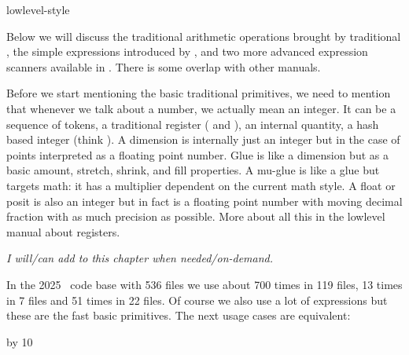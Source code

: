 
\environment lowlevel-style

\startdocument
  [title=expressions,
   color=darkorange]

\startsectionlevel[title=Introduction]

Below we will discuss the traditional arithmetic operations brought by
traditional \TEX, the simple expressions introduced by \ETEX, and two more
advanced expression scanners available in \LUAMETATEX. There is some overlap
with other manuals.

Before we start mentioning the basic traditional primitives, we need to mention
that whenever we talk about a number, we actually mean an integer. It can be a
sequence of tokens, a traditional register (\type {\count} and \type
{\countdef}), an internal quantity, a hash based integer (think \typ
{\integerdef}). A dimension is internally just an integer but in the case of
points interpreted as a  floating point number. Glue is like a
dimension but as a basic amount, stretch, shrink, and fill properties. A mu-glue
is like a glue but targets math: it has a multiplier dependent on the current
math style. A float or posit is also an integer but in fact is a floating point
number with moving decimal fraction with as much precision as possible. More
about all this in the lowlevel manual about registers.

{\em I will/can add to this chapter when needed/on-demand.}

\stopsectionlevel

\startsectionlevel[title={Primitives}]

In the 2025 \CONTEXT\ code base with 536 files we use \type {\advance} about 700
times in 119 files, \type {\multiply} 13 times in 7 files and \type {\divide} 51
times in 22 files. Of course we also use a lot of expressions but these are the
fast basic primitives. The next usage cases are equivalent:

\starttyping[option=TEX]
\advance  \scratchcounter by 10
\advance  {}
\advanceby{}
\stoptyping

